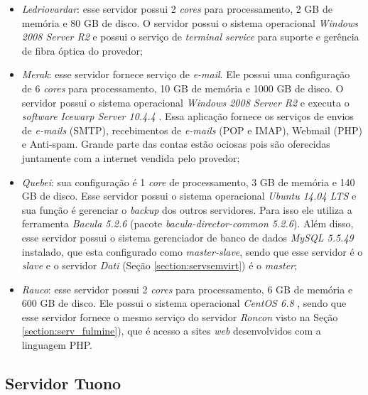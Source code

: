 \begin{itemize}
 \item \textit{Ledriovardar}: esse servidor possui 2 \textit{cores} para processamento, 2 GB de memória e 80 GB de disco. O servidor possui 
 o sistema operacional \textit{Windows 2008 Server R2} e possui o serviço de \textit{terminal service} para suporte e gerência de fibra 
 óptica do provedor;
 
 \item \textit{Merak}: esse servidor fornece serviço de \textit{e-mail}. Ele possui uma configuração de 6 \textit{cores} para processamento, 
 10 GB de memória e 1000 GB de disco. O servidor possui o sistema operacional \textit{Windows 2008 Server R2} e executa o \textit{software} 
 \textit{Icewarp Server 10.4.4} \cite{icewarp}. Essa aplicação fornece os serviços de envios de \textit{e-mails} (\ac{SMTP}), recebimentos 
 de \textit{e-mails} (\ac{POP} e \ac{IMAP}), Webmail (\ac{PHP}) e Anti-spam.
 Grande parte das contas estão ociosas pois são oferecidas juntamente com a internet vendida pelo provedor;
 
 \item \textit{Quebei}: sua configuração é 1 \textit{core} de processamento, 3 GB de memória e 140 GB de disco. Esse servidor possui o 
 sistema operacional \textit{Ubuntu 14.04 \ac{LTS}} \cite{ubuntu} e sua função é gerenciar o \textit{backup} dos outros servidores. Para isso 
 ele utiliza a ferramenta \textit{Bacula 5.2.6} \cite{bacula} (pacote \textit{bacula-director-common 5.2.6}). Além disso, esse servidor possui 
 o sistema gerenciador de banco de dados \textit{MySQL 5.5.49} \cite{mysql} instalado, que esta configurado como \textit{master-slave}, sendo 
 que esse servidor é o \textit{slave} e o servidor \textit{Dati} (Seção \ref{section:servsemvirt}) é o \textit{master};
 
 \item \textit{Rauco}: esse servidor possui 2 \textit{cores} para processamento, 6 GB de memória e 600 GB de disco. Ele possui o sistema 
 operacional \textit{CentOS 6.8} \cite{centos}, sendo que esse servidor fornece o mesmo serviço do servidor \textit{Roncon} visto na 
 Seção \ref{section:serv_fulmine}), que é acesso a sites \textit{web} desenvolvidos com a linguagem \ac{PHP}.
\end{itemize}

\subsection{Servidor Tuono}
\label{section:serv_tuono}

